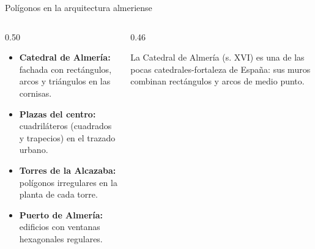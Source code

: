 \documentclass[aspectratio=169, 10pt, spanish]{beamer}
\begin{document}
\begin{frame}{Polígonos en la arquitectura almeriense}
  \begin{columns}[t]
    \begin{column}{0.50\textwidth}
      \begin{ejemplobox}
        \AlmFontSmall
        \begin{itemize}
          \item \textbf{Catedral de Almería:} fachada con rectángulos,
                arcos y triángulos en las cornisas.
          \item \textbf{Plazas del centro:} cuadriláteros (cuadrados
                y trapecios) en el trazado urbano.
          \item \textbf{Torres de la Alcazaba:} polígonos irregulares
                en la planta de cada torre.
          \item \textbf{Puerto de Almería:} edificios con ventanas
                hexagonales regulares.
        \end{itemize}
      \end{ejemplobox}
    \end{column}
    \begin{column}{0.46\textwidth}
      \begin{center}
      \end{center}
      \begin{notabox}[Dato]
        \AlmFontScript La Catedral de Almería (s. XVI) es una de las
        pocas catedrales-fortaleza de España: sus muros combinan
        rectángulos y arcos de medio punto.
      \end{notabox}
    \end{column}
  \end{columns}
\end{frame}
\end{document}
